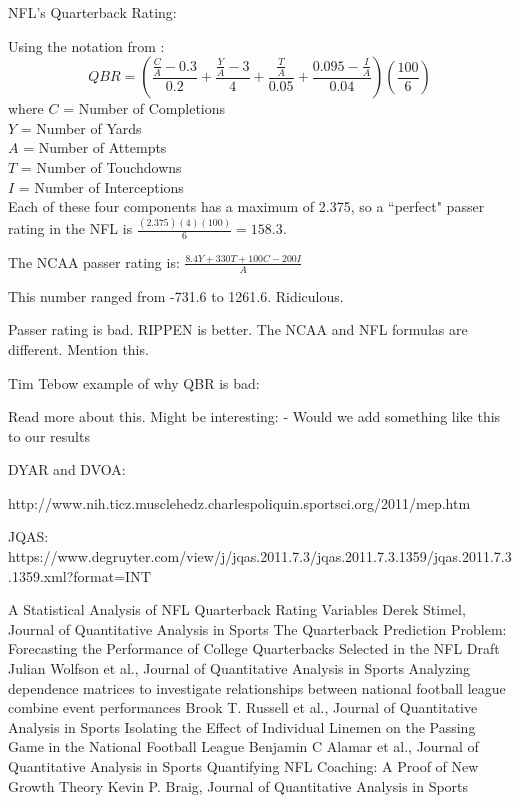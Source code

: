 \documentclass[aoas]{imsart}\usepackage[]{graphicx}\usepackage[]{color}
\begin{document}
NFL's Quarterback Rating: 

Using the notation from \cite{vanDohlen2011}:
$$
QBR = \left(\frac{\frac{C}{A}-0.3}{0.2} + \frac{\frac{Y}{A}-3}{4} + \frac{\frac{T}{A}}{0.05} + \frac{0.095-\frac{I}{A}}{0.04}\right)\left(\frac{100}{6}\right)
$$
where 
$C$ = Number of Completions\\
$Y$ = Number of Yards\\
$A$ = Number of Attempts\\
$T$ = Number of Touchdowns\\
$I$ = Number of Interceptions\\

Each of these four components has a maximum of 2.375, so a ``perfect" passer rating in the NFL is $\frac{(2.375)(4)(100)}{6} = 158.3$.  

The NCAA passer rating is: 
$\frac{8.4Y + 330T + 100C - 200I}{A}$

This number ranged from -731.6 to 1261.6.  Ridiculous.  


Passer rating is bad.  RIPPEN is better.  
The NCAA and NFL formulas are different. Mention this.  

Tim Tebow example of why QBR is bad: 

Read more about this.  Might be interesting:  
- Would we add something like this to our results

DYAR and DVOA: %


http://www.nih.ticz.musclehedz.charlespoliquin.sportsci.org/2011/mep.htm


JQAS: https://www.degruyter.com/view/j/jqas.2011.7.3/jqas.2011.7.3.1359/jqas.2011.7.3.1359.xml?format=INT

A Statistical Analysis of NFL Quarterback Rating Variables
Derek Stimel, Journal of Quantitative Analysis in Sports
The Quarterback Prediction Problem: Forecasting the Performance of College Quarterbacks Selected in the NFL Draft
Julian Wolfson et al., Journal of Quantitative Analysis in Sports
Analyzing dependence matrices to investigate relationships between national football league combine event performances
Brook T. Russell et al., Journal of Quantitative Analysis in Sports
Isolating the Effect of Individual Linemen on the Passing Game in the National Football League
Benjamin C Alamar et al., Journal of Quantitative Analysis in Sports
Quantifying NFL Coaching: A Proof of New Growth Theory
Kevin P. Braig, Journal of Quantitative Analysis in Sports
\end{document}
